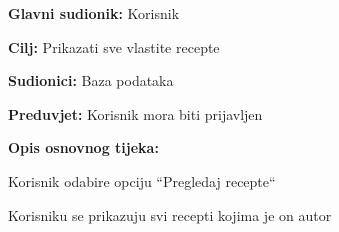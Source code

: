 \noindent {}
\begin{packed_item}

	\item \textbf{Glavni sudionik: } Korisnik
	\item  \textbf{Cilj:} Prikazati sve vlastite recepte
	\item  \textbf{Sudionici:} Baza podataka
	\item  \textbf{Preduvjet:} Korisnik mora biti prijavljen
	\item  \textbf{Opis osnovnog tijeka:}

	\item[] \begin{packed_enum}

		\item Korisnik odabire opciju “Pregledaj recepte“
		\item Korisniku se prikazuju svi recepti kojima je on autor
	\end{packed_enum}
\end{packed_item}

